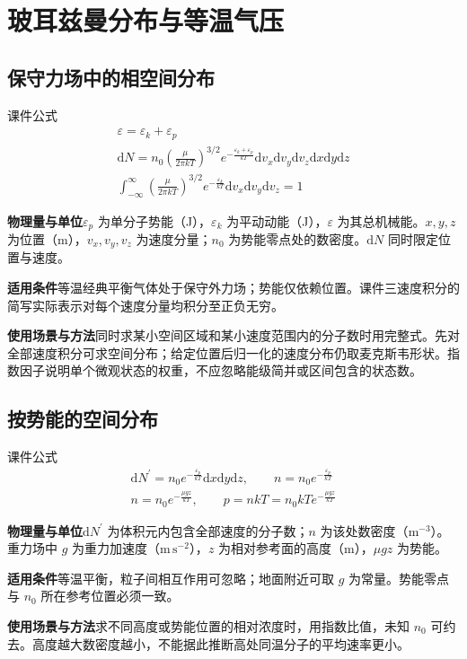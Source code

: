 \documentclass[UTF8,fontset=none,zihao=-4,a4paper]{ctexart}
\newcommand{\chapterpage}[1]{\clearpage\section{#1}}
\newcommand{\explain}[3]{\par\noindent\textbf{物理量与单位}\quad #1\par
\noindent\textbf{适用条件}\quad #2\par
\noindent\textbf{使用场景与方法}\quad #3\par}
\begin{document}
\chapterpage{玻耳兹曼分布与等温气压}
\par\noindent\begin{minipage}{\linewidth}
\subsection{保守力场中的相空间分布}
\begin{infobox}[breakable=false]{课件公式}
\begin{gather*}\varepsilon=\varepsilon_k+\varepsilon_p\\\mathrm dN=n_0\left(\frac\mu{2\pi kT}\right)^{3/2}e^{-\frac{\varepsilon_k+\varepsilon_p}{kT}}\mathrm dv_x\mathrm dv_y\mathrm dv_z\mathrm dx\mathrm dy\mathrm dz\\\int_{-\infty}^{\infty}\left(\frac\mu{2\pi kT}\right)^{3/2}e^{-\frac{\varepsilon_k}{kT}}\mathrm dv_x\mathrm dv_y\mathrm dv_z=1\end{gather*}
\end{infobox}
\end{minipage}\par
\explain{$\varepsilon_p$ 为单分子势能（J），$\varepsilon_k$ 为平动动能（J），$\varepsilon$ 为其总机械能。$x,y,z$ 为位置（m），$v_x,v_y,v_z$ 为速度分量；$n_0$ 为势能零点处的数密度。$\mathrm dN$ 同时限定位置与速度。}{等温经典平衡气体处于保守外力场；势能仅依赖位置。课件三速度积分的简写实际表示对每个速度分量均积分至正负无穷。}{同时求某小空间区域和某小速度范围内的分子数时用完整式。先对全部速度积分可求空间分布；给定位置后归一化的速度分布仍取麦克斯韦形状。指数因子说明单个微观状态的权重，不应忽略能级简并或区间包含的状态数。}


\par\noindent\begin{minipage}{\linewidth}
\subsection{按势能的空间分布}
\begin{infobox}[breakable=false]{课件公式}
\begin{gather*}\mathrm dN^{\prime}=n_0e^{-\frac{\varepsilon_p}{kT}}\mathrm dx\mathrm dy\mathrm dz,\qquad n=n_0e^{-\frac{\varepsilon_p}{kT}}\\n=n_0e^{-\frac{\mu gz}{kT}},\qquad p=nkT=n_0kTe^{-\frac{\mu gz}{kT}}\end{gather*}
\end{infobox}
\end{minipage}\par
\explain{$\mathrm dN^{\prime}$ 为体积元内包含全部速度的分子数；$n$ 为该处数密度（$\mathrm m^{-3}$）。重力场中 $g$ 为重力加速度（$\mathrm{m\,s^{-2}}$），$z$ 为相对参考面的高度（m），$\mu gz$ 为势能。}{等温平衡，粒子间相互作用可忽略；地面附近可取 $g$ 为常量。势能零点与 $n_0$ 所在参考位置必须一致。}{求不同高度或势能位置的相对浓度时，用指数比值，未知 $n_0$ 可约去。高度越大数密度越小，不能据此推断高处同温分子的平均速率更小。}
\end{document}
